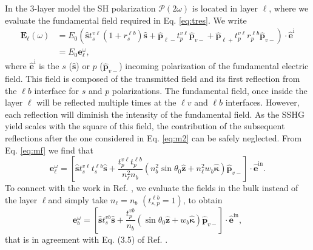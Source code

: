In the 3-layer model the SH polarization $\boldsymbol{\mathcal{P}}(2\omega)$ is
located in layer $\ell$, where we evaluate the fundamental field required in Eq.
\eqref{eq:tres}. We write
\begin{equation}\label{eq:m2}
\begin{split}
\mathbf{E}_{\ell}(\omega) 
&= E_{0}
\left(
  \hat{\mathbf{s}} t^{v\ell}_{s}(1+r^{\ell b}_{s})\hat{\mathbf{s}}
+ \hat{\mathbf{p}}_{\ell-}t^{v\ell}_{p}\hat{\mathbf{p}}_{v-}
+ \hat{\mathbf{p}}_{\ell+}t^{v\ell}_{p}r^{\ell b}_{p}\hat{\mathbf{p}}_{v-}
\right)
\cdot\hat{\mathbf{e}}^{\mathrm{i}}\\
&= E_{0}\mathbf{e}^\omega_{\ell},
\end{split}
\end{equation} 
where $\hat{\mathbf{e}}^{\mathrm{i}}$ is the $s$ ($\hat{\mathbf{s}}$) or $p$
($\hat{\mathbf{p}}_{v-}$) incoming polarization of the fundamental electric
field. This field is composed of the transmitted field and its first reflection
from the $\ell b$ interface for $s$ and $p$ polarizations. The fundamental
field, once inside the layer $\ell$ will be reflected multiple times at the
$\ell v$ and $\ell b$ interfaces. However, each reflection will diminish the
intensity of the fundamental field. As the SSHG yield scales with the square of
this field, the contribution of the subsequent reflections after the one
considered in Eq. \eqref{eq:m2} can be safely neglected. From Eq. \eqref{eq:mf}
we find that
\begin{equation}\label{eq:m12}
\mathbf{e}^{\omega}_{\ell} =
\left[
  \hat{\mathbf{s}}t_{s}^{v\ell}t_{s}^{\ell b}\hat{\mathbf{s}} 
+ \frac{t^{v\ell}_{p}t^{\ell b}_{p}}{n^{2}_{\ell} n_{b}}
\left(
  n^{2}_{b}\sin\theta_{0}\hat{\mathbf{z}} 
+ n^{2}_{\ell} w_b\hat{\boldsymbol{\kappa}}
\right)
\hat{\mathbf{p}}_{v-}
\right]
\cdot\hat{\mathbf{e}}^{\mathrm{in}}.  
\end{equation}  
To connect with the work in Ref. \cite{mizrahiJOSA88}, we evaluate the fields in
the bulk instead of the layer $\ell$and simply take $n_{\ell} = n_{b}$
$(t^{\ell b}_{s,p} = 1)$, to obtain
\begin{equation}\label{eq:m13}
\mathbf{e}^{\omega}_{b} =
\left[
  \hat{\mathbf{s}}t_{s}^{vb}\hat{\mathbf{s}}
+ \frac{t^{vb}_{p}}{n_{b}}
\left(\sin\theta_{0}\hat{\mathbf{z}} + w_b\hat{\boldsymbol{\kappa}}\right) 
\hat{\mathbf{p}}_{v-}
\right]
\cdot\hat{\mathbf{e}}^{\mathrm{in}},  
\end{equation} 
that is in agreement with Eq. (3.5) of Ref. \cite{mizrahiJOSA88}.

